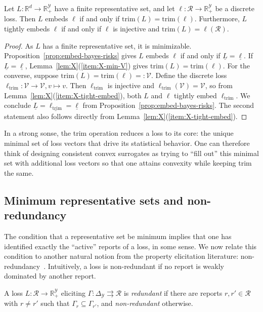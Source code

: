 \documentclass[twoside,11pt]{article}
\newcommand{\reals}{\mathbb{R}}
\newcommand{\simplex}{\Delta_\Y}
\newcommand{\R}{\mathcal{R}}
\newcommand{\V}{\mathcal{V}}
\newcommand{\Y}{\mathcal{Y}}
\newcommand{\risk}[1]{\underline{#1}}
\newcommand{\toto}{\rightrightarrows}
\newcommand{\trim}{\mathrm{trim}}
\newcommand{\trimcover}{\mathrm{trim}}
\begin{document}
\begin{proposition}\label{prop:embed-iff-trims-equal}
  Let $L:\reals^d\to\reals^\Y_+$ have a finite representative set, and let $\ell:\R\to\reals^\Y_+$ be a discrete loss.
  Then $L$ embeds $\ell$ if and only if $\trimcover(L) = \trimcover(\ell)$.
  Furthermore, $L$ tightly embeds $\ell$ if and only if $\ell$ is injective and $\trimcover(L) = \ell(\R)$.
\end{proposition}
\begin{proof}
  As $L$ has a finite representative set, it is minimizable.
  Proposition~\ref{prop:embed-bayes-risks} gives $L$ embeds $\ell$ if and only if $\risk L = \risk \ell$.
  If $\risk L = \risk \ell$, Lemma~\ref{lem:X}(\ref{item:X-min-V}) gives $\trim(L) = \trim(\ell)$.
  For the converse, suppose $\trim(L) = \trim(\ell) =: \V$.
  Define the discrete loss $\ell_\trim : \V \to \V, v\mapsto v$.
  Then $\ell_\trim$ is injective and $\ell_\trim(\V) = \V$, so from Lemma~\ref{lem:X}(\ref{item:X-tight-embed}), both $L$ and $\ell$ tightly embed $\ell_\trim$.
  We conclude $\risk L = \risk{\ell_\trim} = \risk \ell$ from Proposition~\ref{prop:embed-bayes-risks}.
  The second statement also follows directly from Lemma~\ref{lem:X}(\ref{item:X-tight-embed}).
\end{proof}

In a strong sonse, the trim operation reduces a loss to its core: the unique minimal set of loss vectors that drive its statistical behavior.
One can therefore think of designing consistent convex surrogates as trying to ``fill out'' this minimal set with additional loss vectors so that one attains convexity while keeping trim the same.

\subsection{Minimum representative sets and non-redundancy}
\label{sec:min-rep-sets-trim}

The condition that a representative set be minimum implies that one has identified exactly the ``active'' reports of a loss, in some sense.
We now relate this condition to another natural notion from the property elicitation literature: non-redundancy~\cite{frongillo2014general,lambert2018elicitation}.
Intuitively, a loss is non-redundant if no report is weakly dominated by another report.

\begin{definition}\label{def:nonredundant}
  A loss $L : \R \to \reals^\Y_+$ eliciting $\Gamma:\simplex \toto \R$ is \emph{redundant} if there are reports $r, r' \in \R$ with $r \neq r'$ such that $\Gamma_r \subseteq \Gamma_{r'}$, and \emph{non-redundant} otherwise.
\end{definition}
\end{document}

